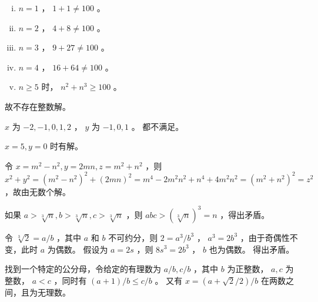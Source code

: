 {{        %
        \begin{practices}
            \begin{enumerate}[i.]
                \item $n = 1$ ， $1 + 1 \neq 100$ 。
                \item $n = 2$ ， $4 + 8 \neq 100$ 。
                \item $n = 3$ ， $9 + 27 \neq 100$ 。
                \item $n = 4$ ， $16 + 64 \neq 100$ 。
                \item $n \geq 5$ 时， $n^2 + n^3 \geq 100$ 。
            \end{enumerate}

            故不存在整数解。
        \end{practices}

        \begin{practices}
            $x$ 为 $-2, -1, 0, 1, 2$ ， $y$ 为 $-1, 0, 1$ 。
            都不满足。
        \end{practices}

        \begin{practices}
            $x = 5, y = 0$ 时有解。
        \end{practices}

        \begin{practices}
            令 $x = m^2 - n^2, y = 2mn, z = m^2 + n^2$ ，则 $x^2 + y^2 = (m^2 - n^2)^2 + (2mn)^2 = m^4 - 2m^2n^2 + n^4 + 4m^2n^2 = (m^2 + n^2)^2 = z^2$ ，故由无数个解。
        \end{practices}

        \begin{practices}
            如果 $a > \sqrt[3]{n}, b > \sqrt[3]{n}, c > \sqrt[3]{n}$ ，则 $abc > (\sqrt[3]{n})^3 = n$ ，得出矛盾。
        \end{practices}

        \begin{practices}
            令 $\sqrt[3]{2} = a / b$ ，其中 $a$ 和 $b$ 不可约分，则 $2 = a^3 / b^3$ ， $a^3 = 2b^3$ ，由于奇偶性不变，此时 $a$ 为偶数。
            假设为 $a = 2s$ ，则 $8s^3 = 2b^3$ ， $b$ 也为偶数。
            得出矛盾。
        \end{practices}

        \begin{practices}
            找到一个特定的公分母，令给定的有理数为 $a / b, c / b$ ，其中 $b$ 为正整数， $a, c$ 为整数， $a < c$ ，同时有 $(a + 1) / b \leq c / b$ 。
            又有 $x = (a + \sqrt{2} / 2) / b$ 在两数之间，且为无理数。
        \end{practices}

}}

